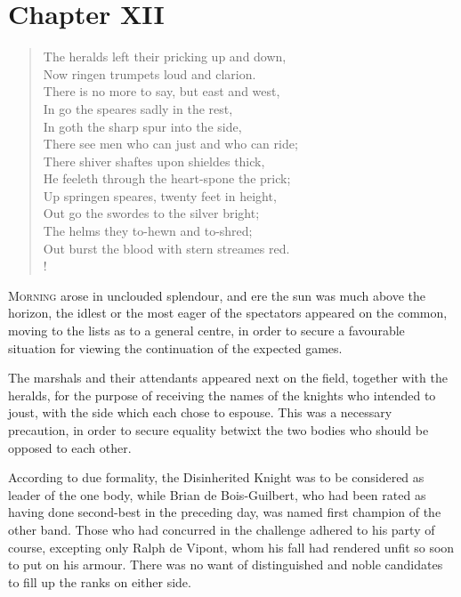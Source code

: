 \chapter{Chapter XII}

\begin{verse}
The heralds left their pricking up and down,\\
Now ringen trumpets loud and clarion.\\
There is no more to say, but east and west,\\
In go the speares sadly in the rest,\\
In goth the sharp spur into the side,\\
There see men who can just and who can ride;\\
There shiver shaftes upon shieldes thick,\\
He feeleth through the heart-spone the prick;\\
Up springen speares, twenty feet in height,\\
Out go the swordes to the silver bright;\\
The helms they to-hewn and to-shred;\\
Out burst the blood with stern streames red.\\!
\end{verse}

\lettrine{M}{orning} arose in unclouded splendour, and ere the sun was
much above the
horizon, the idlest or the most eager of the spectators appeared on the
common, moving to the lists as to a general centre, in order to secure a
favourable situation for viewing the continuation of the expected games.

The marshals and their attendants appeared next on the field, together
with the heralds, for the purpose of receiving the names of the knights
who intended to joust, with the side which each chose to espouse. This
was a necessary precaution, in order to secure equality betwixt the two
bodies who should be opposed to each other.

According to due formality, the Disinherited Knight was to be considered
as leader of the one body, while Brian de Bois-Guilbert, who had been
rated as having done second-best in the preceding day, was named first
champion of the other band. Those who had concurred in the challenge
adhered to his party of course, excepting only Ralph de Vipont, whom his
fall had rendered unfit so soon to put on his armour. There was no want
of distinguished and noble candidates to fill up the ranks on either
side.


